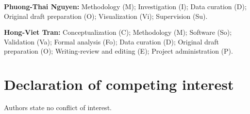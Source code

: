 \documentclass[preprint,12pt]{elsarticle}
\begin{document}
\textbf{Phuong-Thai Nguyen:} Methodology (M); Investigation (I); Data curation (D); Original draft preparation (O); Visualization (Vi); Supervision (Su).

\textbf{Hong-Viet Tran:} Conceptualization (C); Methodology (M); Software (So); Validation (Va); Formal analysis (Fo); Data curation (D); Original draft preparation (O); Writing-review and editing (E); Project administration (P).

\section*{Declaration of competing interest}
Authors state no conflict of interest.










\clearpage





\clearpage
\end{document}
